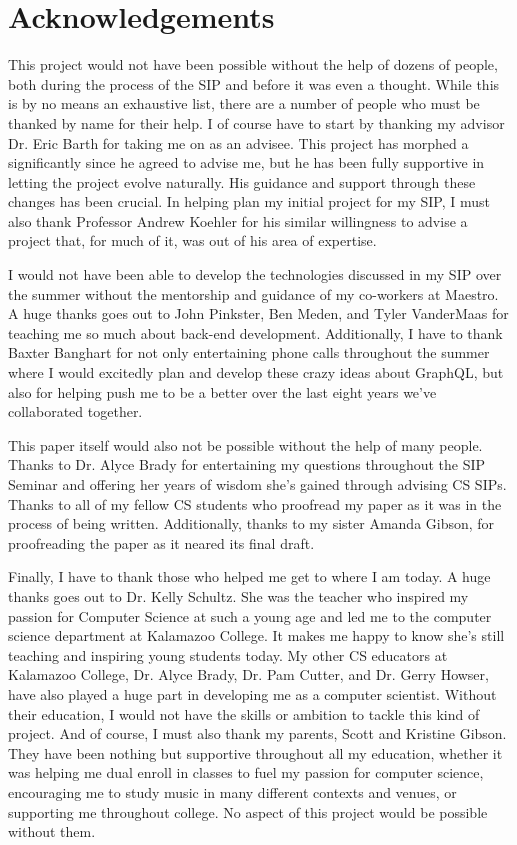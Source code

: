 \section*{Acknowledgements}
This project would not have been possible without the help of dozens of people, both during the process of the SIP and before it was even a thought.  While this is by no means an exhaustive list, there are a number of people who must be thanked by name for their help.  I of course have to start by thanking my advisor Dr. Eric Barth for taking me on as an advisee.  This project has morphed a significantly since he agreed to advise me, but he has been fully supportive in letting the project evolve naturally.  His guidance and support through these changes has been crucial.  In helping plan my initial project for my SIP, I must also thank Professor Andrew Koehler for his similar willingness to advise a project that, for much of it, was out of his area of expertise.

I would not have been able to develop the technologies discussed in my SIP over the summer without the mentorship and guidance of my co-workers at Maestro.  A huge thanks goes out to John Pinkster, Ben Meden, and Tyler VanderMaas for teaching me so much about back-end development.  Additionally, I have to thank Baxter Banghart for not only entertaining phone calls throughout the summer where I would excitedly plan and develop these crazy ideas about GraphQL, but also for helping push me to be a better over the last eight years we've collaborated together.

This paper itself would also not be possible without the help of many people.  Thanks to Dr. Alyce Brady for entertaining my questions throughout the SIP Seminar and offering her years of wisdom she's gained through advising CS SIPs.  Thanks to all of my fellow CS students who proofread my paper as it was in the process of being written.  Additionally, thanks to my sister Amanda Gibson, for proofreading the paper as it neared its final draft.

Finally, I have to thank those who helped me get to where I am today.  A huge thanks goes out to Dr. Kelly Schultz.  She was the teacher who inspired my passion for Computer Science at such a young age and led me to the computer science department at Kalamazoo College.  It makes me happy to know she's still teaching and inspiring young students today.  My other CS educators at Kalamazoo College, Dr. Alyce Brady, Dr. Pam Cutter, and Dr. Gerry Howser, have also played a huge part in developing me as a computer scientist.  Without their education, I would not have the skills or ambition to tackle this kind of project.   And of course, I must also thank my parents, Scott and Kristine Gibson.  They have been nothing but supportive throughout all my education, whether it was helping me dual enroll in classes to fuel my passion for computer science, encouraging me to study music in many different contexts and venues, or supporting me throughout college. No aspect of this project would be possible without them.
\newpage
